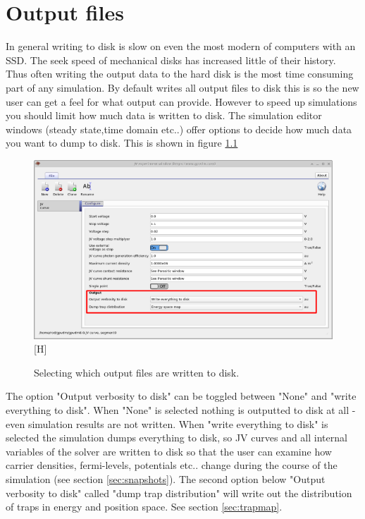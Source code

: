 \chapter{Output files}
In general writing to disk is slow on even the most modern of computers with an SSD.  The seek speed of mechanical disks has increased little of their history.  Thus often writing the output data to the hard disk is the most time consuming part of any simulation.  By default \simname writes all output files to disk this is so the new user can get a feel for what output \simname can provide.  However to speed up simulations you should limit how much data is written to disk. The simulation editor windows (steady state,time domain etc..) offer options to decide how much data you want to dump to disk. This is shown in figure \ref{fig:jveditorwindow} 

\begin{figure}[H]
\centering
\includegraphics[width=\textwidth]{./images/jv_editor_window.png}[H]
\caption{Selecting which output files are written to disk.}
\label{fig:jveditorwindow}
\end{figure}

The option "Output verbosity to disk" can be toggled between "None" and "write everything to disk".  When "None" is selected nothing is outputted to disk at all - even simulation results are not written.  When "write everything to disk" is selected the simulation dumps everything to disk, so JV curves and all internal variables of the solver are written to disk so that the user can examine how carrier densities, fermi-levels, potentials etc.. change during the course of the simulation (see section \ref{sec:snapshots}). The second option below "Output verbosity to disk" called "dump trap distribution" will write out the distribution of traps in energy and position space.  See section \ref{sec:trapmap}.


